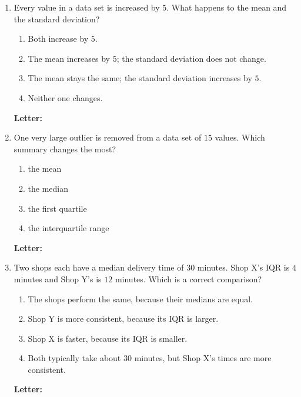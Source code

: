 \documentclass[10pt]{article}
\begin{document}
\begin{enumerate}[leftmargin=2.2em, itemsep=5pt, topsep=2pt, start=11]
\boxguard[9]
\item Every value in a data set is increased by $5$. What happens to the mean and the standard
deviation?
\begin{enumerate}[label=(\Alph*), leftmargin=1.8em, itemsep=1pt, topsep=1pt]
  \item Both increase by $5$.
  \item The mean increases by $5$; the standard deviation does not change.
  \item The mean stays the same; the standard deviation increases by $5$.
  \item Neither one changes.
\end{enumerate}
\hfill \textbf{Letter:} \gradedblank[id=q14, type=choice, points=2, answer={B}]{0.9cm}{11pt}

\boxguard[9]
\item One very large outlier is removed from a data set of $15$ values. Which summary
changes the most?
\begin{enumerate}[label=(\Alph*), leftmargin=1.8em, itemsep=1pt, topsep=1pt]
  \item the mean
  \item the median
  \item the first quartile
  \item the interquartile range
\end{enumerate}
\hfill \textbf{Letter:} \gradedblank[id=q15, type=choice, points=2, answer={A}]{0.9cm}{11pt}

\boxguard[9]
\item Two shops each have a median delivery time of $30$ minutes. Shop X's IQR is $4$
minutes and Shop Y's is $12$ minutes. Which is a correct comparison?
\begin{enumerate}[label=(\Alph*), leftmargin=1.8em, itemsep=1pt, topsep=1pt]
  \item The shops perform the same, because their medians are equal.
  \item Shop Y is more consistent, because its IQR is larger.
  \item Shop X is faster, because its IQR is smaller.
  \item Both typically take about $30$ minutes, but Shop X's times are more consistent.
\end{enumerate}
\hfill \textbf{Letter:} \gradedblank[id=q16, type=choice, points=2, answer={D}]{0.9cm}{11pt}

\end{enumerate}
\normalsize
\end{document}
